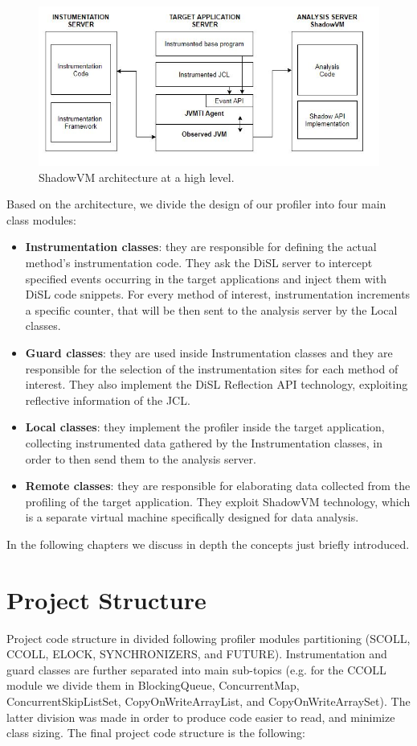 \documentclass[]{usiinfthesis}
\begin{document}
\begin{figure}
    \centering
    \includegraphics[scale=0.7]{Immagini/DiSL_Architecture.JPG} 
    \caption{ShadowVM architecture at a high level.}
    \label{fig:fig1}
\end{figure}

\noindent
Based on the architecture, we divide the design of our profiler into four main class modules:
\begin{itemize}
    \item \textbf{Instrumentation classes}: they are responsible for defining the actual method's instrumentation code. They ask the DiSL server to intercept specified events occurring in the target applications and inject them with DiSL code snippets. For every method of interest, instrumentation increments a specific counter, that will be then sent to the analysis server by the Local classes.
    \item \textbf{Guard classes}: they are used inside Instrumentation classes and they are responsible for the selection of the instrumentation sites for each method of interest. They also implement the DiSL Reflection API technology, exploiting reflective information of the JCL.
    \item \textbf{Local classes}: they implement the profiler inside the target application, collecting instrumented data gathered by the Instrumentation classes, in order to then send them to the analysis server.
    \item \textbf{Remote classes}: they are responsible for elaborating data collected from the profiling of the target application. They exploit ShadowVM technology, which is a separate virtual machine specifically designed for data analysis.
\end{itemize}
In the following chapters we discuss in depth the concepts just briefly introduced. 


\section{Project Structure}
Project code structure in divided following profiler modules partitioning (SCOLL, CCOLL, ELOCK, SYNCHRONIZERS, and FUTURE). Instrumentation and guard classes are further separated into main sub-topics (e.g. for the CCOLL module we divide them in BlockingQueue, ConcurrentMap, ConcurrentSkipListSet, CopyOnWriteArrayList, and CopyOnWriteArraySet). The latter division was made in order to produce code easier to read, and minimize class sizing. The final project code structure is the following:
\end{document}
